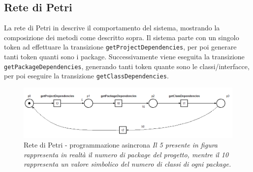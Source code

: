 \documentclass[a4paper,12pt]{report}
\begin{document}
\subsection{Rete di Petri}
La rete di Petri in  descrive il comportamento del sistema, mostrando la composizione dei metodi come descritto sopra. Il sistema parte con un singolo token ad effettuare la transizione \texttt{getProjectDependencies}, per poi generare tanti token quanti sono i package. Successivamente viene eseguita la transizione \texttt{getPackageDependencies}, generando tanti token quante sono le classi/interfacce, per poi eseguire la transizione \texttt{getClassDependencies}.
\begin{figure}[H]
    \centering
    \includegraphics[width=\linewidth]{figures/async.png}
    \caption{\centering Rete di Petri - programmazione asincrona \newline \textit{Il 5 presente in figura rappresenta in realtà il numero di package del progetto, mentre il 10 rappresenta un valore simbolico del numero di classi di ogni package.}}
    \label{fig:petri-net-async}
\end{figure}
\end{document}
